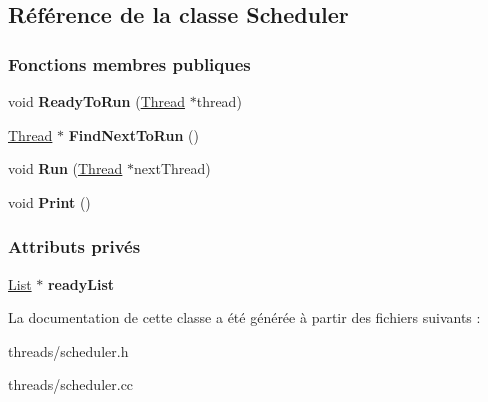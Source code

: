 \hypertarget{class_scheduler}{}\subsection{Référence de la classe Scheduler}
\label{class_scheduler}
\subsubsection*{Fonctions membres publiques}
\begin{DoxyCompactItemize}
\item 
\hypertarget{class_scheduler_a18e89ab130a40c423da77673f12585d7}{}\label{class_scheduler_a18e89ab130a40c423da77673f12585d7} 
void {\bfseries Ready\+To\+Run} (\hyperlink{class_thread}{Thread} $\ast$thread)
\item 
\hypertarget{class_scheduler_a0fa7daec8d1058a8e6b5cbfbdd09555e}{}\label{class_scheduler_a0fa7daec8d1058a8e6b5cbfbdd09555e} 
\hyperlink{class_thread}{Thread} $\ast$ {\bfseries Find\+Next\+To\+Run} ()
\item 
\hypertarget{class_scheduler_a87205b0773d3dd84752ec779c890f5e1}{}\label{class_scheduler_a87205b0773d3dd84752ec779c890f5e1} 
void {\bfseries Run} (\hyperlink{class_thread}{Thread} $\ast$next\+Thread)
\item 
\hypertarget{class_scheduler_ae82d9a7b506449c5a32d29b81e536076}{}\label{class_scheduler_ae82d9a7b506449c5a32d29b81e536076} 
void {\bfseries Print} ()
\end{DoxyCompactItemize}
\subsubsection*{Attributs privés}
\begin{DoxyCompactItemize}
\item 
\hypertarget{class_scheduler_a205f525d5055d006c26ab61b584e3bf6}{}\label{class_scheduler_a205f525d5055d006c26ab61b584e3bf6} 
\hyperlink{class_list}{List} $\ast$ {\bfseries ready\+List}
\end{DoxyCompactItemize}


La documentation de cette classe a été générée à partir des fichiers suivants \+:\begin{DoxyCompactItemize}
\item 
threads/scheduler.\+h\item 
threads/scheduler.\+cc\end{DoxyCompactItemize}

